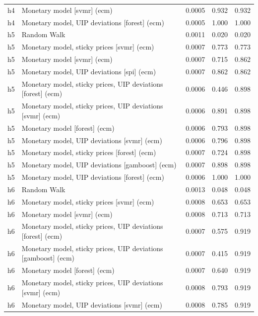 \begin{ThreePartTable}
\begin{longtable}[t]{cp{5.5cm}ccc}
h4 & \raggedright Monetary model [svmr] (ecm) & 0.0005 & 0.932 & 0.932\\
h4 & \raggedright Monetary model, UIP deviations [forest] (ecm) & 0.0005 & 1.000 & 1.000\\
\addlinespace
h5 & \raggedright Random Walk & 0.0011 & 0.020 & 0.020\\
h5 & \raggedright Monetary model, sticky prices [svmr] (ecm) & 0.0007 & 0.773 & 0.773\\
h5 & \raggedright Monetary model [svmr] (ecm) & 0.0007 & 0.715 & 0.862\\
h5 & \raggedright Monetary model, UIP deviations [spi] (ecm) & 0.0007 & 0.862 & 0.862\\
h5 & \raggedright Monetary model, sticky prices, UIP deviations [forest] (ecm) & 0.0006 & 0.446 & 0.898\\
h5 & \raggedright Monetary model, sticky prices, UIP deviations [svmr] (ecm) & 0.0006 & 0.891 & 0.898\\
h5 & \raggedright Monetary model [forest] (ecm) & 0.0006 & 0.793 & 0.898\\
h5 & \raggedright Monetary model, UIP deviations [svmr] (ecm) & 0.0006 & 0.796 & 0.898\\
h5 & \raggedright Monetary model, sticky prices [forest] (ecm) & 0.0007 & 0.724 & 0.898\\
h5 & \raggedright Monetary model, UIP deviations [gamboost] (ecm) & 0.0007 & 0.898 & 0.898\\
h5 & \raggedright Monetary model, UIP deviations [forest] (ecm) & 0.0006 & 1.000 & 1.000\\
\addlinespace
h6 & \raggedright Random Walk & 0.0013 & 0.048 & 0.048\\
h6 & \raggedright Monetary model, sticky prices [svmr] (ecm) & 0.0008 & 0.653 & 0.653\\
h6 & \raggedright Monetary model [svmr] (ecm) & 0.0008 & 0.713 & 0.713\\
h6 & \raggedright Monetary model, sticky prices, UIP deviations [forest] (ecm) & 0.0007 & 0.575 & 0.919\\
h6 & \raggedright Monetary model, sticky prices, UIP deviations [gamboost] (ecm) & 0.0007 & 0.415 & 0.919\\
h6 & \raggedright Monetary model [forest] (ecm) & 0.0007 & 0.640 & 0.919\\
h6 & \raggedright Monetary model, sticky prices, UIP deviations [svmr] (ecm) & 0.0008 & 0.793 & 0.919\\
h6 & \raggedright Monetary model, UIP deviations [svmr] (ecm) & 0.0008 & 0.785 & 0.919\\

\end{longtable}
\end{ThreePartTable}
